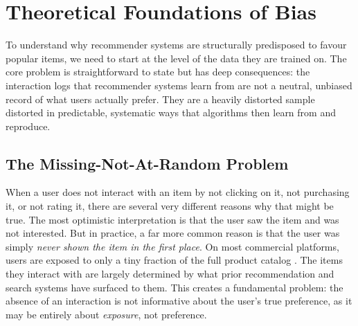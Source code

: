 \documentclass[11pt,a4paper]{report}
\begin{document}
\section{Theoretical Foundations of Bias}
\label{sec:lit_mnar}

To understand why recommender systems are structurally predisposed to favour popular items, we need to start at the level of the data they are trained on. The core problem is straightforward to state but has deep consequences: the interaction logs that recommender systems learn from are not a neutral, unbiased record of what users actually prefer. They are a heavily distorted sample distorted in predictable, systematic ways that algorithms then learn from and reproduce.

\subsection*{The Missing-Not-At-Random Problem}

When a user does not interact with an item by not clicking on it, not purchasing it, or not rating it, there are several very different reasons why that might be true. The most optimistic interpretation is that the user saw the item and was not interested. But in practice, a far more common reason is that the user was simply \emph{never shown the item in the first place}. On most commercial platforms, users are exposed to only a tiny fraction of the full product catalog \citep{brynjolfsson2006niches}. The items they interact with are largely determined by what prior recommendation and search systems have surfaced to them. This creates a fundamental problem: the absence of an interaction is not informative about the user's true preference, as it may be entirely about \emph{exposure}, not preference.
\end{document}
